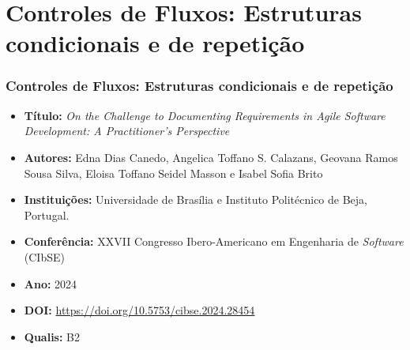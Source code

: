 \section{Controles de Fluxos: Estruturas condicionais e de repetição}
\begin{frame}
	\frametitle{Controles de Fluxos: Estruturas condicionais e de repetição}
	\begin{itemize}
		\item \textbf{Título:}	\textit{On the Challenge to Documenting Requirements in Agile Software Development: A Practitioner’s Perspective}
		
		
		\item \textbf{Autores:}	Edna Dias Canedo, Angelica Toffano S. Calazans, Geovana Ramos Sousa Silva, Eloisa Toffano Seidel Masson e Isabel Sofia Brito 
		
		\item \textbf{Instituições:} Universidade de Brasília e Instituto Politécnico de Beja, Portugal.
		
		\item \textbf{Conferência:}	XXVII Congresso Ibero-Americano em Engenharia de \textit{Software} (CIbSE) 
		
		\item \textbf{Ano:}	2024 
		
		\item \textbf{DOI:}	\url{https://doi.org/10.5753/cibse.2024.28454}
		
		\item \textbf{Qualis:} B2
	\end{itemize}
\end{frame}



